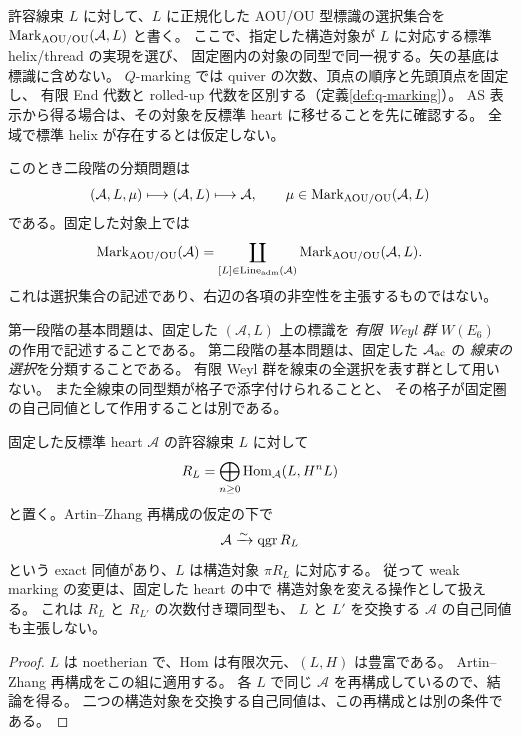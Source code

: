 許容線束 $L$ に対して、$L$ に正規化した AOU/OU 型標識の選択集合を
$\operatorname{Mark}_{\rm AOU/OU}(\mathcal A,L)$ と書く。
ここで、指定した構造対象が $L$ に対応する標準 helix/thread の実現を選び、
固定圏内の対象の同型で同一視する。矢の基底は標識に含めない。
$Q$-marking では quiver の次数、頂点の順序と先頭頂点を固定し、
有限 End 代数と rolled-up 代数を区別する（定義\ref{def:q-marking}）。
AS 表示から得る場合は、その対象を反標準 heart に移せることを先に確認する。
全域で標準 helix が存在するとは仮定しない。

このとき二段階の分類問題は
\begin{equation}\label{eq:set-two-forgettings}
 (\mathcal A,L,\mu)\longmapsto(\mathcal A,L)\longmapsto\mathcal A,
 \qquad \mu\in\operatorname{Mark}_{\rm AOU/OU}(\mathcal A,L)
\end{equation}
である。固定した対象上では
\begin{equation}\label{eq:set-union-markings}
 \operatorname{Mark}_{\rm AOU/OU}(\mathcal A)
 =\coprod_{[L]\in\operatorname{Line}_{\rm adm}(\mathcal A)}
   \operatorname{Mark}_{\rm AOU/OU}(\mathcal A,L).
\end{equation}
これは選択集合の記述であり、右辺の各項の非空性を主張するものではない。

第一段階の基本問題は、固定した $(\mathcal A,L)$ 上の標識を
\emph{有限 Weyl 群 $W(E_6)$} の作用で記述することである。
第二段階の基本問題は、固定した $\mathcal A_{\rm ac}$ の
\emph{線束の選択}を分類することである。
有限 Weyl 群を線束の全選択を表す群として用いない。
また全線束の同型類が格子で添字付けられることと、
その格子が固定圏の自己同値として作用することは別である。

\begin{proposition}[許容線束による反標準表示の変更]\label{prop:ac-line-reconstruction}
固定した反標準 heart $\mathcal A$ の許容線束 $L$ に対して
\[
 R_L=\bigoplus_{n\ge0}\operatorname{Hom}_{\mathcal A}(L,H^nL)
\]
と置く。Artin--Zhang 再構成の仮定の下で
\[
 \mathcal A\xrightarrow{\sim}\operatorname{qgr} R_L
\]
という exact 同値があり、$L$ は構造対象 $\pi R_L$ に対応する。
従って weak marking の変更は、固定した heart の中で
構造対象を変える操作として扱える。
これは $R_L$ と $R_{L'}$ の次数付き環同型も、
$L$ と $L'$ を交換する $\mathcal A$ の自己同値も主張しない。
\end{proposition}
\begin{proof}
$L$ は noetherian で、Hom は有限次元、$(L,H)$ は豊富である。
Artin--Zhang 再構成\cite[Theorem 4.5]{AZ}をこの組に適用する。
各 $L$ で同じ $\mathcal A$ を再構成しているので、結論を得る。
二つの構造対象を交換する自己同値は、この再構成とは別の条件である。
\end{proof}

